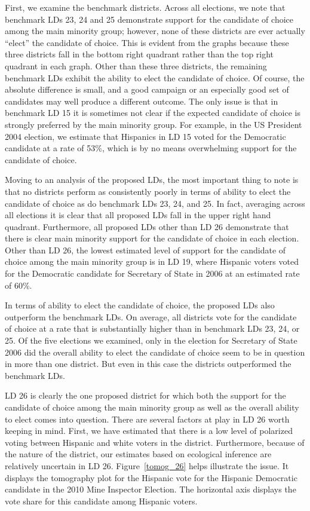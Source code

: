 \documentclass[12pt]{article}
\begin{document}
First, we examine the benchmark districts. Across all elections, we
note that benchmark LDs 23, 24 and 25 demonstrate support for the
candidate of choice among the main minority group; however, none of
these districts are ever actually ``elect'' the candidate of choice.
This is evident from the graphs because these three districts fall in
the bottom right quadrant rather than the top right quadrant in each
graph. Other than these three districts, the remaining benchmark LDs
exhibit the ability to elect the candidate of choice.  Of course, the
absolute difference is small, and a good campaign or an especially
good set of candidates may well produce a different outcome.  The only
issue is that in benchmark LD 15 it is sometimes not clear if the
expected candidate of choice is strongly preferred by the main
minority group.  For example, in the US President 2004 election, we
estimate that Hispanics in LD 15 voted for the Democratic candidate at
a rate of 53\%, which is by no means overwhelming support for the
candidate of choice.

Moving to an analysis of the proposed LDs, the most important thing to
note is that no districts perform as consistently poorly in terms of
ability to elect the candidate of choice as do benchmark LDs 23, 24,
and 25. In fact, averaging across all elections it is clear that all
proposed LDs fall in the upper right hand quadrant. Furthermore, all
proposed LDs other than LD 26 demonstrate that there is clear main
minority support for the candidate of choice in each election. Other
than LD 26, the lowest estimated level of support for the candidate of
choice among the main minority group is in LD 19, where Hispanic
voters voted for the Democratic candidate for Secretary of State in
2006 at an estimated rate of 60\%.

In terms of ability to elect the candidate of choice, the proposed LDs
also outperform the benchmark LDs. On average, all districts vote for
the candidate of choice at a rate that is substantially higher than in
benchmark LDs 23, 24, or 25. Of the five elections we examined, only
in the election for Secretary of State 2006 did the overall ability to
elect the candidate of choice seem to be in question in more than one
district. But even in this case the districts outperformed the
benchmark LDs.

LD 26 is clearly the one proposed district for which both the support
for the candidate of choice among the main minority group as well as
the overall ability to elect comes into question. There are several
factors at play in LD 26 worth keeping in mind. First, we have
estimated that there is a low level of polarized voting between
Hispanic and white voters in the district. Furthermore, because of the
nature of the district, our estimates based on ecological inference
are relatively uncertain in LD 26. Figure~\ref{tomog_26} helps
illustrate the issue. It displays the tomography plot for the Hispanic
vote for the Hispanic Democratic candidate in the 2010 Mine Inspector
Election. The horizontal axis displays the vote share for this
candidate among Hispanic voters.
\end{document}

